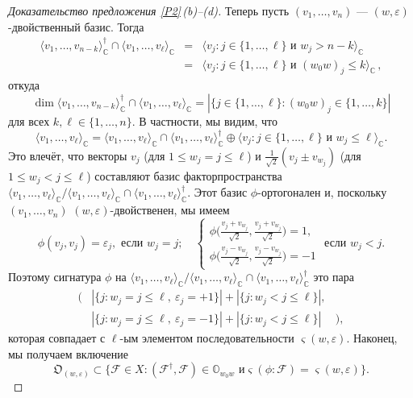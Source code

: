 \documentclass{amsart}
\theoremstyle{definition}
\begin{document}
\begin{proof}[Доказательство предложения \ref{P2}\,{\rm (b)}--{\rm (d)}]
Теперь пусть $(v_1,\ldots,v_n)$ --- $(w,\varepsilon)$-двойственный базис. Тогда
\begin{eqnarray*}
\langle v_1,\ldots,v_{n-k}\rangle_\mathbb{C}^\dag\cap\langle
v_1,\ldots,v_\ell\rangle_\mathbb{C} & = & \langle
v_j:j\in\{1,\ldots,\ell\}\mbox{ и }w_j>n-k\rangle_\mathbb{C} \\
 & = & \langle
v_j:j\in\{1,\ldots,\ell\}\mbox{ и }(w_0w)_j\leq k\rangle_\mathbb{C}\,,
\end{eqnarray*}
откуда
\[\dim\langle v_1,\ldots,v_{n-k}\rangle_\mathbb{C}^\dag\cap\langle v_1,\ldots,v_\ell\rangle_\mathbb{C}=|\{j\in\{1,\ldots,\ell\}:(w_0w)_j\in\{1,\ldots,k\}|\]
для всех $k,\ell\in\{1,\ldots,n\}$. В частности, мы видим, что
\[\langle v_1,\ldots,v_\ell\rangle_\mathbb{C}=\langle v_1,\ldots,v_\ell\rangle_\mathbb{C}\cap\langle v_1,\ldots,v_\ell\rangle_\mathbb{C}^\dag\oplus\langle v_j:
j\in\{1,\ldots,\ell\}\mbox{ и }w_j\leq \ell\rangle_\mathbb{C}.\] Это влечёт, что векторы $v_j$ (для $1\leq w_j=j\leq \ell$) и
$\frac{1}{\sqrt{2}}(v_j\pm v_{w_j})$ (для $1\leq w_j<j\leq \ell$)
составляют базис факторпространства $\langle
v_1,\ldots,v_\ell\rangle_\mathbb{C}/\langle v_1,\ldots,v_\ell\rangle_\mathbb{C}\cap\langle
v_1,\ldots,v_\ell\rangle_\mathbb{C}^\dag$. Этот базис $\phi$-ортогонален и,
поскольку $(v_1,\ldots,v_n)$  $(w,\varepsilon)$-двойственен, мы имеем
\[
\textstyle \phi(v_j,v_j)=\varepsilon_j,\mbox{ если $w_j=j$};\quad
\left\{\begin{array}{l}
\phi\big(\frac{v_j+v_{w_j}}{\sqrt{2}},\frac{v_j+v_{w_j}}{\sqrt{2}}\big)=1,\\[2mm]
\phi\big(\frac{v_j-v_{w_j}}{\sqrt{2}},\frac{v_j-v_{w_j}}{\sqrt{2}}\big)=-1
\end{array}\right.\mbox{ если $w_j<j$.}
\]
Поэтому сигнатура $\phi$ на $\langle
v_1,\ldots,v_\ell\rangle_\mathbb{C}/\langle v_1,\ldots,v_\ell\rangle_\mathbb{C}\cap\langle
v_1,\ldots,v_\ell\rangle_\mathbb{C}^\dag$ это пара
\[
\begin{array}{rll}
\big( & |\{j:w_j=j\leq\ell,\
\varepsilon_j=+1\}|+|\{j:w_j<j\leq\ell\}|,
\\[2mm]
 & |\{j:w_j=j\leq\ell,\
\varepsilon_j=-1\}|+|\{j:w_j<j\leq\ell\}| & \big),\end{array}
\]
которая совпадает с  $\ell$-ым элементом последовательности
$\varsigma(w,\varepsilon)$. Наконец, мы получаем включение
\begin{equation}
\label{4} \mathfrak{O}_{(w,\varepsilon)}\subset\big\{\mathcal{F}\in
X: (\mathcal{F}^\dag,\mathcal{F})\in\mathbb{O}_{w_0w}\mbox{ и
}\varsigma(\phi:\mathcal{F})=\varsigma(w,\varepsilon)\big\}.
\end{equation}


\end{proof}
\end{document}
